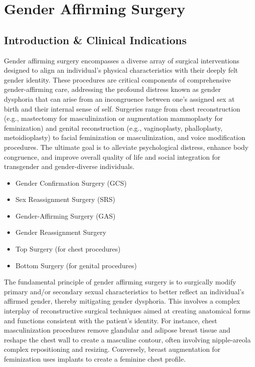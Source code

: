 \chapter{Gender Affirming Surgery}

\section*{Introduction \& Clinical Indications}
Gender affirming surgery encompasses a diverse array of surgical interventions designed to align an individual's physical characteristics with their deeply felt gender identity. These procedures are critical components of comprehensive gender-affirming care, addressing the profound distress known as gender dysphoria that can arise from an incongruence between one's assigned sex at birth and their internal sense of self. Surgeries range from chest reconstruction (e.g., mastectomy for masculinization or augmentation mammoplasty for feminization) and genital reconstruction (e.g., vaginoplasty, phalloplasty, metoidioplasty) to facial feminization or masculinization, and voice modification procedures. The ultimate goal is to alleviate psychological distress, enhance body congruence, and improve overall quality of life and social integration for transgender and gender-diverse individuals.

\begin{itemize}
  \item Gender Confirmation Surgery (GCS)
  \item Sex Reassignment Surgery (SRS)
  \item Gender-Affirming Surgery (GAS)
  \item Gender Reassignment Surgery
  \item Top Surgery (for chest procedures)
  \item Bottom Surgery (for genital procedures)
\end{itemize}

The fundamental principle of gender affirming surgery is to surgically modify primary and/or secondary sexual characteristics to better reflect an individual's affirmed gender, thereby mitigating gender dysphoria. This involves a complex interplay of reconstructive surgical techniques aimed at creating anatomical forms and functions consistent with the patient's identity. For instance, chest masculinization procedures remove glandular and adipose breast tissue and reshape the chest wall to create a masculine contour, often involving nipple-areola complex repositioning and resizing. Conversely, breast augmentation for feminization uses implants to create a feminine chest profile.

